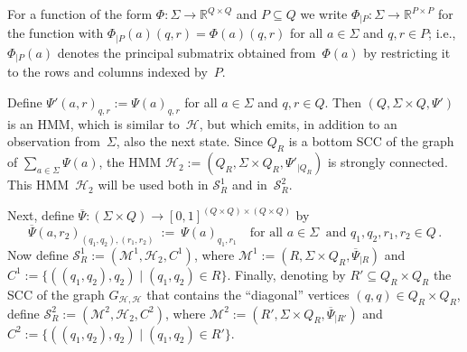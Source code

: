 \documentclass[a4paper,UKenglish,cleveref, autoref,mathscr]{lipics-v2019}
\newcommand{\RR}{\mathbb{R}}
\newcommand{\1}{\mathbbm{1}}
\renewcommand{\H}{\mathcal{H}}
\newcommand{\M}{\mathcal{M}}
\renewcommand{\S}{\mathcal{S}}
\begin{document}
For a function of the form $\Phi : \Sigma \to \RR^{Q \times Q}$ and $P \subseteq Q$ we write $\Phi_{|P} : \Sigma \to \RR^{P \times P}$ for the function with $\Phi_{|P}(a)(q,r) = \Phi(a)(q,r)$ for all $a \in \Sigma$ and $q,r \in P$; i.e., $\Phi_{|P}(a)$ denotes the principal submatrix obtained from~$\Phi(a)$ by restricting it to the rows and columns indexed by~$P$.

Define $\Psi'(a,r)_{q,r} := \Psi(a)_{q,r}$ for all $a \in \Sigma$ and $q,r \in Q$.
Then $(Q, \Sigma \times Q, \Psi')$ is an HMM, which is similar to~$\H$, but which emits, in addition to an observation from~$\Sigma$, also the next state.
Since $Q_R$ is a bottom SCC of the graph of $\sum_{a \in \Sigma} \Psi(a)$, the HMM $\H_2 := (Q_R, \Sigma \times Q_R, \Psi'_{|Q_R})$ is strongly connected.
This HMM~$\H_2$ will be used both in $\S_R^1$ and in~$\S_R^2$.

Next, define $\overline{\Psi} : (\Sigma \times Q) \to [0,1]^{(Q \times Q) \times (Q \times Q)}$ by
\[
 \overline{\Psi}(a,r_2)_{(q_1,q_2),(r_1,r_2)} \ := \ \Psi(a)_{q_1,r_1} \quad \text{for all } a \in \Sigma\ \text{ and } q_1, q_2, r_1, r_2 \in Q\,.
\]
Now define $\S_R^1 := (\M^1, \H_2, C^1)$, where $\M^1 := (R, \Sigma \times Q_R, \overline{\Psi}_{|R})$ %
and $C^1 := \{((q_1,q_2),q_2) \mid (q_1,q_2) \in R\}$.
%
Finally, denoting by $R' \subseteq Q_R \times Q_R$ the SCC of the graph $G_{\H,\H}$ that contains the ``diagonal'' vertices $(q,q) \in Q_R \times Q_R$, define $\S_R^2 := (\M^2, \H_2, C^2)$, where $\M^2 := (R', \Sigma \times Q_R, \overline{\Psi}_{|R'})$
and $C^2 := \{((q_1,q_2),q_2) \mid (q_1,q_2) \in R'\}$.
\end{document}

